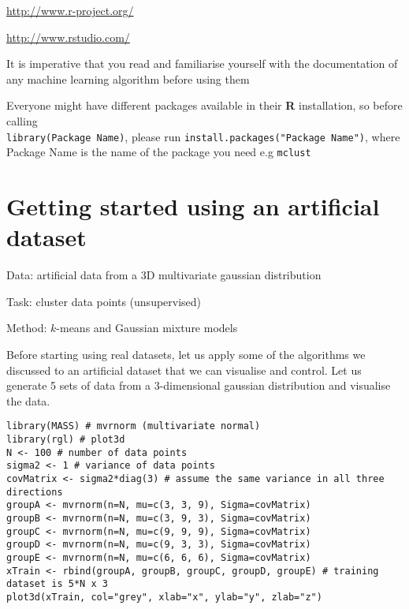\documentclass[a4paper,11pt]{article}
\begin{document}
\begin{description}[leftmargin=11em,style=nextline]
	\item[Installing \textbf{R}:] \url{http://www.r-project.org/} 
	\item[Installing RStudio:] \url{http://www.rstudio.com/}
\end{description}  

\begin{framed}
It is imperative that you read and familiarise yourself with the documentation of 
any machine learning algorithm before using them 
\end{framed}

Everyone might have different packages available in their \textbf{R} installation, so
before calling\\ 
{\lstinline[style=RCode, basicstyle=\normalsize\ttfamily] |library(Package Name)|}, please run
{\lstinline[style=RCode, basicstyle=\normalsize\ttfamily] |install.packages("Package Name")|}, where
Package Name is the name of the package you need e.g {\lstinline[style=RCode, basicstyle=\normalsize\ttfamily] |mclust|}

\clearpage
\section{Getting started using an artificial dataset}
\begin{framed}
\begin{description}[leftmargin=5em,style=nextline]\addtolength{\itemsep}{-0.2\baselineskip}
	\item[Data:] artificial data from a 3D multivariate gaussian distribution
	\item[Task:] cluster data points (unsupervised)
	\item[Method:] $k$-means and Gaussian mixture models
\end{description} 
\end{framed}

Before starting using real datasets, let us apply some of the algorithms we discussed
to an artificial dataset that we can visualise and control. Let us generate 5 sets of data
from a 3-dimensional gaussian distribution and visualise the data.
\\
\begin{lstlisting}[style=RCode]
library(MASS) # mvrnorm (multivariate normal)
library(rgl) # plot3d
N <- 100 # number of data points
sigma2 <- 1 # variance of data points
covMatrix <- sigma2*diag(3) # assume the same variance in all three directions
groupA <- mvrnorm(n=N, mu=c(3, 3, 9), Sigma=covMatrix)
groupB <- mvrnorm(n=N, mu=c(3, 9, 3), Sigma=covMatrix)
groupC <- mvrnorm(n=N, mu=c(9, 9, 9), Sigma=covMatrix)
groupD <- mvrnorm(n=N, mu=c(9, 3, 3), Sigma=covMatrix)
groupE <- mvrnorm(n=N, mu=c(6, 6, 6), Sigma=covMatrix)
xTrain <- rbind(groupA, groupB, groupC, groupD, groupE) # training dataset is 5*N x 3
plot3d(xTrain, col="grey", xlab="x", ylab="y", zlab="z")
\end{lstlisting}
\end{document}
